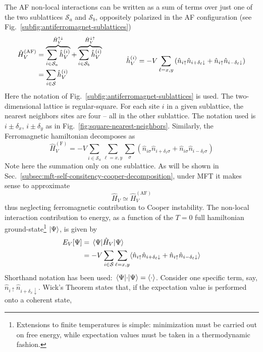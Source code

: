 The AF non-local interactions can be written as a sum of terms over just one of the two sublattices $\mathcal{S}_a$ and $\mathcal{S}_b$, oppositely polarized in the AF configuration (see Fig.~\ref{subfig:antiferromagnet-sublattices})
\[
	\begin{aligned}
		\hat H_V^{(\mathrm{AF})} &= \overbrace{
			\sum_{i \in \mathcal{S}_a} \hat h_V^{(i)}
		}^{\hat H_V^{\uparrow\downarrow}} + \overbrace{
			\sum_{i \in \mathcal{S}_b} \hat h_V^{(i)}
		}^{\hat H_V^{\downarrow\uparrow}} \\
		&= \sum_{i \in \mathcal{S}} \hat h_V^{(i)}
	\end{aligned}
	\hspace{0.1\textwidth}
	\hat h_V^{(i)} = -V \sum_{\ell = x,y} \left(
		\hat n_{i\uparrow} \hat n_{i + \delta_\ell \downarrow} + \hat n_{i\uparrow} \hat n_{i - \delta_\ell \downarrow} 
	\right) 
\]
Here the notation of Fig.~\ref{subfig:antiferromagnet-sublattices} is used. The two-dimensional lattice is regular-square. For each site $i$ in a given sublattice, the nearest neighbors sites are four -- all in the other sublattice. The notation used is $i \pm \delta_x$, $i \pm  \delta_y$ as in Fig.~\ref{fig:square-nearest-neighbors}. Similarly, the Ferromagnetic hamiltonian decomposes as
\[
	\hat H_V^{(\mathrm{F})} = -V \sum_{i \in \mathcal{S}_a} \sum_{\ell = x,y} \sum_\sigma \left(
		\hat n_{i\sigma} \hat n_{i + \delta_\ell \sigma} + \hat n_{i\sigma} \hat n_{i - \delta_\ell \sigma} 
	\right) 
\]
Note here the summation only on one sublattice. As will be shown in Sec.~\ref{subsec:mft-self-consitency-cooper-decomposition}, under MFT it makes sense to approximate
\[
	\hat H_V \simeq \hat{H}_V^{(\mathrm{AF})}
\]
thus neglecting ferromagnetic contribution to Cooper instability. The non-local interaction contribution to energy, as a function of the $T=0$ full hamiltonian ground-state\footnote{
	Extensions to finite temperatures is simple: minimization must be carried out on free energy, while expectation values must be taken in a thermodynamic fashion.
} $\ket{\Psi}$, is given by
\[
\begin{aligned}
	E_V [\Psi] &= \mel{\Psi}{\hat H_V}{\Psi} \\
	&= -V \sum_{i \in \mathcal{S}} \sum_{\ell = x,y} \langle
	\hat n_{i\uparrow} \hat n_{i + \delta_\ell \downarrow} + \hat n_{i\uparrow} \hat n_{i - \delta_\ell \downarrow}
	\rangle 
\end{aligned}
\]
Shorthand notation has been used: $\mel{\Psi}{\cdot}{\Psi} = \langle \cdot \rangle$. Consider one specific term, say, $\hat n_{i\uparrow} \hat n_{i + \delta_x \downarrow}$. Wick's Theorem states that, if the expectation value is performed onto a coherent state,
